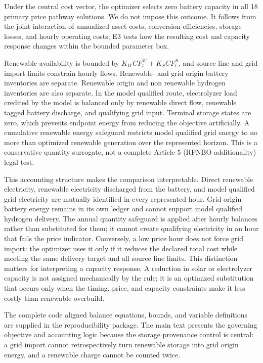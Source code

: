 \documentclass[largeformat]{interact}
\begin{document}
Under the central cost vector, the optimizer selects zero battery
capacity in all 18 primary price pathway solutions. We do not impose
this outcome. It follows from the joint interaction of annualized asset
costs, conversion efficiencies, storage losses, and hourly operating
costs; E3 tests how the resulting cost and capacity response changes
within the bounded parameter box.

Renewable availability is bounded by \(K_WCF^W_t+K_SCF^S_t\), and source
line and grid import limits constrain hourly flows. Renewable- and grid
origin battery inventories are separate. Renewable origin and non
renewable hydrogen inventories are also separate. In the model qualified
route, electrolyzer load credited by the model is balanced only by
renewable direct flow, renewable tagged battery discharge, and
qualifying grid input. Terminal storage states are zero, which prevents
endpoint energy from reducing the objective artificially. A cumulative
renewable energy safeguard restricts model qualified grid energy to no
more than optimized renewable generation over the represented horizon.
This is a conservative quantity surrogate, not a complete Article 5
(RFNBO additionality) legal test.

This accounting structure makes the comparison interpretable. Direct
renewable electricity, renewable electricity discharged from the
battery, and model qualified grid electricity are mutually identified in
every represented hour. Grid origin battery energy remains in its own
ledger and cannot support model qualified hydrogen delivery. The annual
quantity safeguard is applied after hourly balances rather than
substituted for them; it cannot create qualifying electricity in an hour
that fails the price indicator. Conversely, a low price hour does not
force grid import: the optimizer uses it only if it reduces the declared
total cost while meeting the same delivery target and all source line
limits. This distinction matters for interpreting a capacity response. A
reduction in solar or electrolyzer capacity is not assigned mechanically
by the rule; it is an optimized substitution that occurs only when the
timing, price, and capacity constraints make it less costly than
renewable overbuild.

The complete code aligned balance equations, bounds, and variable
definitions are supplied in the reproducibility package. The main text
presents the governing objective and accounting logic because the
storage provenance control is central: a grid import cannot
retrospectively turn renewable storage into grid origin energy, and a
renewable charge cannot be counted twice.
\end{document}
